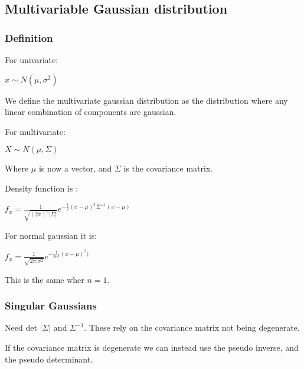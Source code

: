 
\subsection{Multivariable Gaussian distribution}

\subsubsection{Definition}

For univariate:

\(x \sim N(\mu, \sigma^2 )\)

We define the multivariate gaussian distribution as the distribution where any linear combination of components are gaussian.

For multivariate:

\(X \sim N(\mu, \Sigma )\)

Where \(\mu \) is now a vector, and \(\Sigma \) is the covariance matrix.

Density function is :

\(f_x=\frac{1}{\sqrt {(2\pi )^n|\Sigma |}} e^{-\frac{1}{2}(x-\mu )^T\Sigma^{-1}(x-\mu)}\)

For normal gaussian it is:

\(f_x=\frac{1}{\sqrt {2\pi |\sigma^2}} e^{-\frac{1}{2\sigma^2}(x-\mu )^2)}\)

This is the same wher \(n=1\).

\subsubsection{Singular Gaussians}

Need det \(|\Sigma |\) and \(\Sigma^{-1}\). These rely on the covariance matrix not being degenerate.

If the covariance matrix is degenerate we can instead use the pseudo inverse, and the pseudo determinant.

